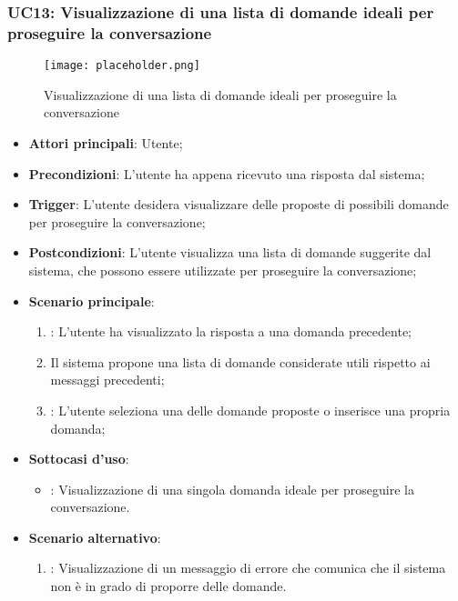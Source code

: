 \hypertarget{UC13}{}
\subsubsection{UC13: Visualizzazione di una lista di domande ideali per proseguire la conversazione}

\begin{figure}[h]
    \centering
    \texttt{[image: placeholder.png]}
    \caption{Visualizzazione di una lista di domande ideali per proseguire la conversazione}
\end{figure}

\begin{itemize}
    \item \textbf{Attori principali}: Utente;
    \item \textbf{Precondizioni}: L'utente ha appena ricevuto una risposta dal sistema;
    \item \textbf{Trigger}: L'utente desidera visualizzare delle proposte di possibili domande per proseguire la conversazione;
    \item \textbf{Postcondizioni}: L'utente visualizza una lista di domande suggerite dal sistema, che possono essere utilizzate per proseguire la conversazione;
    \item \textbf{Scenario principale}:
    \begin{enumerate}
        \item {}: L'utente ha visualizzato la risposta a una domanda precedente;
        \item Il sistema propone una lista di domande considerate utili rispetto ai messaggi precedenti;
        \item {}: L'utente seleziona una delle domande proposte o inserisce una propria domanda;
    \end{enumerate}
    \item \textbf{Sottocasi d'uso}:
    \begin{itemize}
        \item {}: Visualizzazione di una singola domanda ideale per proseguire la conversazione.
    \end{itemize}
    \item \textbf{Scenario alternativo}:
    \begin{enumerate}
        \item {}: Visualizzazione di un messaggio di errore che comunica che il sistema non è in grado di proporre delle domande.
    \end{enumerate}
\end{itemize}

